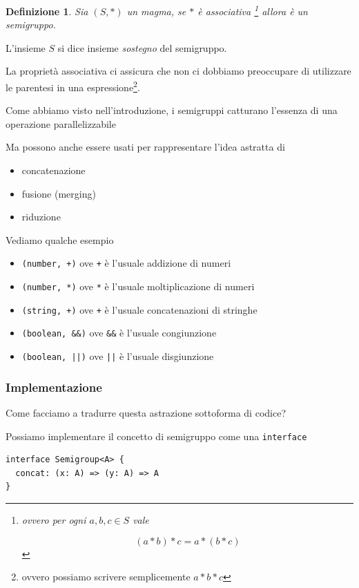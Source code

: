 \documentclass[12pt]{article}
\newtheorem{definition}{Definizione}
\begin{document}
\begin{definition}
Sia $(S, *)$ un magma, se $*$ è associativa \footnote{ovvero per ogni $a, b, c \in S$ vale

$$
(a * b) * c = a * ( b * c )
$$
} allora è un \emph{semigruppo}.
\end{definition}

L'insieme $S$ si dice insieme \emph{sostegno} del semigruppo.

La proprietà associativa ci assicura che non ci dobbiamo preoccupare di utilizzare le parentesi in una espressione\footnote{ovvero possiamo scrivere semplicemente $a * b * c$}.

Come abbiamo visto nell'introduzione, i semigruppi catturano l'essenza di una operazione parallelizzabile

Ma possono anche essere usati per rappresentare l'idea astratta di

\begin{itemize}
  \item concatenazione
  \item fusione (merging)
  \item riduzione
\end{itemize}

Vediamo qualche esempio

\begin{itemize}
  \item \texttt{(number, +)} ove \texttt{+} è l'usuale addizione di numeri
  \item \texttt{(number, *)} ove \texttt{*} è l'usuale moltiplicazione di numeri
  \item \texttt{(string, +)} ove \texttt{+} è l'usuale concatenazioni di stringhe
  \item \texttt{(boolean, \&\&)} ove \texttt{\&\&} è l'usuale congiunzione
  \item \texttt{(boolean, ||)} ove \texttt{||} è l'usuale disgiunzione
\end{itemize}

\subsubsection{Implementazione}

Come facciamo a tradurre questa astrazione sottoforma di codice?

Possiamo implementare il concetto di semigruppo come una \texttt{interface}

\begin{verbatim}
interface Semigroup<A> {
  concat: (x: A) => (y: A) => A
}
\end{verbatim}
\end{document}
